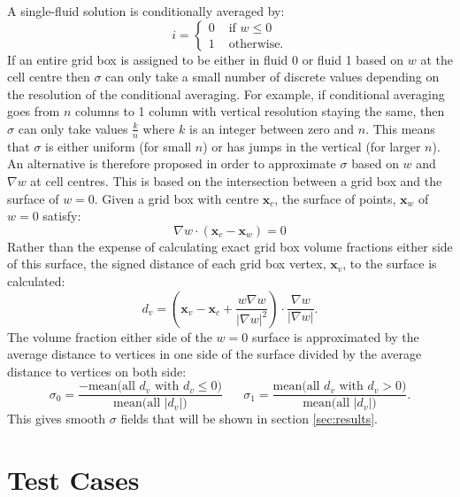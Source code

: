\documentclass[draft]{agujournal2019}
\begin{document}
A single-fluid solution is conditionally averaged by:
\begin{equation}
i =
\begin{cases}
    0 & \text{ if }w\le 0 \\
    1 & \text{ otherwise.}
\end{cases}
\end{equation}
If an entire grid box is assigned to be either in fluid 0 or fluid 1 based on $w$ at the cell centre then $\sigma$ can only take a small number of discrete values depending on the resolution of the conditional averaging. For example, if conditional averaging goes from $n$ columns to 1 column with vertical resolution staying the same, then $\sigma$ can only take values $\frac{k}{n}$ where $k$ is an integer between zero and $n$. This means that $\sigma$ is either uniform (for small $n$) or has jumps in the vertical (for larger $n$). An alternative is therefore proposed in order to approximate $\sigma$ based on $w$ and $\nabla w$ at cell centres. This is based on the intersection between a grid box and the surface of $w=0$. Given a grid box with centre $\mathbf{x}_c$, the surface of points, $\mathbf{x}_w$ of $w=0$ satisfy:
\begin{equation}
\nabla w \cdot \left(\mathbf{x}_c - \mathbf{x}_w\right) = 0
\end{equation}
Rather than the expense of calculating exact grid box volume fractions either side of this surface, the signed distance of each grid box vertex, $\mathbf{x}_v$, to the surface is calculated:
\begin{equation}
d_v = \left(
     \mathbf{x}_v - \mathbf{x}_c + \frac{w \nabla w}{|\nabla w|^2} 
\right) \cdot \frac{\nabla w}{|\nabla w|}.
\end{equation}
The volume fraction either side of the $w=0$ surface is approximated by the average distance to vertices in one side of the surface divided by the average distance to vertices on both side:
\begin{equation}
\sigma_0 = 
\frac{-\text{mean}\bigl(\text{all } d_v \text{ with } d_v \le 0\bigr)}
{\text{mean}\bigl(\text{all } |d_v| \bigl)}
\;\;\;\;\;\;
\sigma_1 = 
\frac{\text{mean}\bigl(\text{all } d_v \text{ with } d_v > 0\bigr)}
{\text{mean}\bigl(\text{all } |d_v| \bigl)}.
\end{equation}
This gives smooth $\sigma$ fields that will be shown in section \ref{sec:results}.

\section{\label{sec:results} Test Cases}
\end{document}
